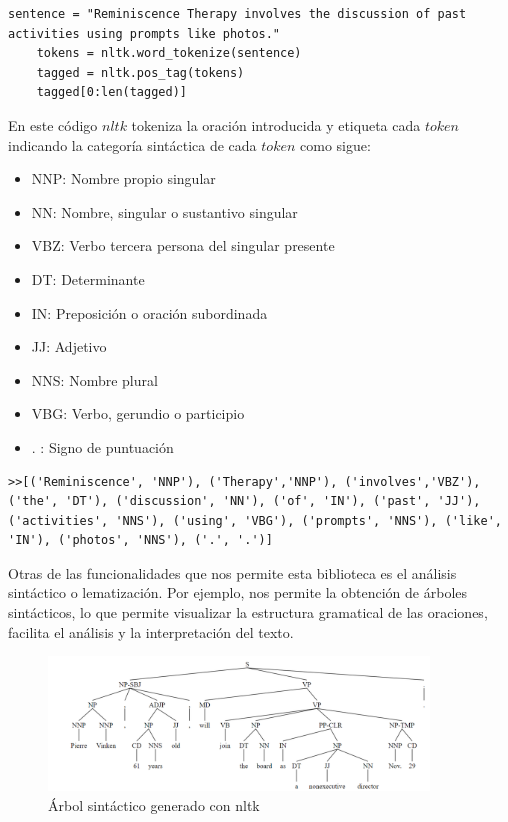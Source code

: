 \begin{lstlisting}[style=SpyderStyle, caption={Ejemplo de código en Python}, captionpos=b, label={lst:python},breaklines = true]
	sentence = "Reminiscence Therapy involves the discussion of past activities using prompts like photos."
	tokens = nltk.word_tokenize(sentence)
	tagged = nltk.pos_tag(tokens)
	tagged[0:len(tagged)]
\end{lstlisting}

En este código $nltk$ tokeniza la oración introducida y etiqueta cada $token$ indicando la categoría sintáctica de cada $token$ como sigue:

\begin{itemize}
	\item NNP: Nombre propio singular
	\item NN: Nombre, singular o sustantivo singular
	\item VBZ: Verbo tercera persona del singular presente
	\item DT: Determinante
	\item IN: Preposición o oración subordinada
	\item JJ: Adjetivo
	\item NNS: Nombre plural 
	\item VBG: Verbo, gerundio o participio
	\item . : Signo de puntuación
\end{itemize}

\begin{lstlisting}[style=SpyderStyle, caption={Tokenización y etiquetado con nltk}, captionpos=b, label={lst:python},breaklines = true]
>>[('Reminiscence', 'NNP'), ('Therapy','NNP'), ('involves','VBZ'), ('the', 'DT'), ('discussion', 'NN'), ('of', 'IN'), ('past', 'JJ'), ('activities', 'NNS'), ('using', 'VBG'), ('prompts', 'NNS'), ('like', 'IN'), ('photos', 'NNS'), ('.', '.')]

\end{lstlisting}

Otras de las funcionalidades que nos permite esta biblioteca es el análisis sintáctico o lematización. Por ejemplo, nos permite la obtención de árboles sintácticos, lo que permite visualizar la estructura gramatical de las oraciones, facilita el análisis y la interpretación del texto. \\

\begin{figure}[h]
	\centering
	\includegraphics[width=0.9\textwidth]{Imagenes/arbolsintactico}
	\caption{Árbol sintáctico generado con nltk}
	\label{fig:2}
\end{figure}

